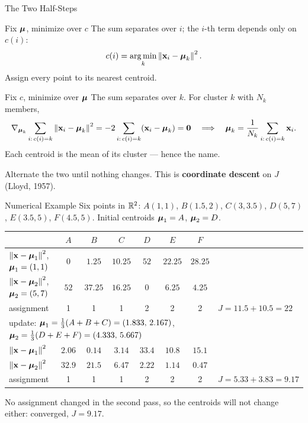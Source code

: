 \documentclass[11pt,aspectratio=169]{beamer}
\begin{document}
\begin{frame}{The Two Half-Steps}\small
\begin{derivation}{Fix $\boldsymbol{\mu}$, minimize over $c$}
The sum separates over $i$; the $i$-th term depends only on $c(i)$:
\[
c(i)=\operatorname*{arg\,min}_k\left\lVert \mathbf{x}_i-\boldsymbol{\mu}_k \right\rVert^2 .
\]
Assign every point to its nearest centroid.
\end{derivation}
\begin{derivation}{Fix $c$, minimize over $\boldsymbol{\mu}$}
The sum separates over $k$. For cluster $k$ with $N_k$ members,
\[
\nabla_{\boldsymbol{\mu}_k}\sum_{i:\,c(i)=k}\left\lVert \mathbf{x}_i-\boldsymbol{\mu}_k \right\rVert^2=-2\sum_{i:\,c(i)=k}(\mathbf{x}_i-\boldsymbol{\mu}_k)=\mathbf{0}
\quad\Longrightarrow\quad
\boldsymbol{\mu}_k=\frac1{N_k}\sum_{i:\,c(i)=k}\mathbf{x}_i .
\]
Each centroid is the mean of its cluster --- hence the name.
\end{derivation}
Alternate the two until nothing changes. This is \textbf{coordinate descent} on $J$ (Lloyd, 1957).
\end{frame}

\begin{frame}{Numerical Example}\scriptsize
Six points in $\mathbb{R}^2$: $A(1,1)$, $B(1.5,2)$, $C(3,3.5)$, $D(5,7)$, $E(3.5,5)$, $F(4.5,5)$. Initial centroids $\boldsymbol{\mu}_1=A$, $\boldsymbol{\mu}_2=D$.
\begin{center}
\begin{tabular}{lcccccc|l}
\toprule
 & $A$ & $B$ & $C$ & $D$ & $E$ & $F$ & \\
\midrule
$\left\lVert \mathbf{x}-\boldsymbol{\mu}_1 \right\rVert^2$, $\boldsymbol{\mu}_1=(1,1)$ & $0$ & $1.25$ & $10.25$ & $52$ & $22.25$ & $28.25$ & \\
$\left\lVert \mathbf{x}-\boldsymbol{\mu}_2 \right\rVert^2$, $\boldsymbol{\mu}_2=(5,7)$ & $52$ & $37.25$ & $16.25$ & $0$ & $6.25$ & $4.25$ & \\
assignment & 1 & 1 & 1 & 2 & 2 & 2 & $J=11.5+10.5=22$ \\
\midrule
\multicolumn{7}{l}{update: $\boldsymbol{\mu}_1=\tfrac13(A+B+C)=(1.833,\,2.167)$, \quad $\boldsymbol{\mu}_2=\tfrac13(D+E+F)=(4.333,\,5.667)$} & \\
\midrule
$\left\lVert \mathbf{x}-\boldsymbol{\mu}_1 \right\rVert^2$ & $2.06$ & $0.14$ & $3.14$ & $33.4$ & $10.8$ & $15.1$ & \\
$\left\lVert \mathbf{x}-\boldsymbol{\mu}_2 \right\rVert^2$ & $32.9$ & $21.5$ & $6.47$ & $2.22$ & $1.14$ & $0.47$ & \\
assignment & 1 & 1 & 1 & 2 & 2 & 2 & $J=5.33+3.83=9.17$ \\
\bottomrule
\end{tabular}
\end{center}
No assignment changed in the second pass, so the centroids will not change either: converged, $J=9.17$.
\end{frame}
\end{document}
